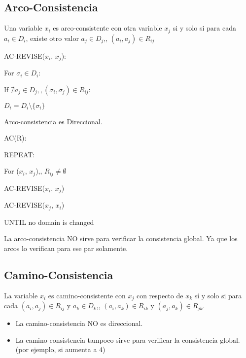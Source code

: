\documentclass[12pt, twoside, openright]{report} %
\begin{document}
\subsection{Arco-Consistencia}

Una variable \(x_i\) es arco-consistente con otra variable \(x_j\) si
y solo si para cada \(a_i \in D_i\), existe otro valor
\(a_j \in D_j\),, \((a_i,a_j) \in R_{ij}\)

AC-REVISE($x_i$, $x_j$):

\hspace{0.6cm} For $\sigma_i \in D_i$:

\hspace{1.2cm} If $\nexists a_j \in D_j ,, (\sigma_i, \sigma_j) \in R_{ij}$:

\hspace{1.8cm} $D_i = D_i \setminus \{ \sigma_i \}$

Arco-consistencia es Direccional.

AC(R):

\hspace{0.6cm} REPEAT:

\hspace{1.2cm} For ($x_i$, $x_j$),, $R_{ij} \neq \emptyset$

\hspace{1.8cm} AC-REVISE($x_i$, $x_j$)

\hspace{1.8cm} AC-REVISE($x_j$, $x_i$)

\hspace{0.6cm} UNTIL no domain is changed

La arco-consistencia NO sirve para verificar la consistencia global.
Ya que los arcos lo verifican para ese par solamente.



\subsection{Camino-Consistencia}


La variable \(x_i\) es camino-consistente con \(x_j\) con respecto
de \(x_k\) sí y solo si para cada \((a_i,a_j) \in R_{ij}\) y
\(a_k \in D_k\),, \((a_i,a_k) \in R_{ik}\) y
\((a_j,a_k) \in R_{jk}\).

\begin{itemize}
	\item La camino-consistencia NO es direccional.
	\item La camino-consistencia tampoco sirve para verificar la
	      consistencia global. (por ejemplo, si aumenta a 4)

\end{itemize}
\pagebreak
\end{document}
